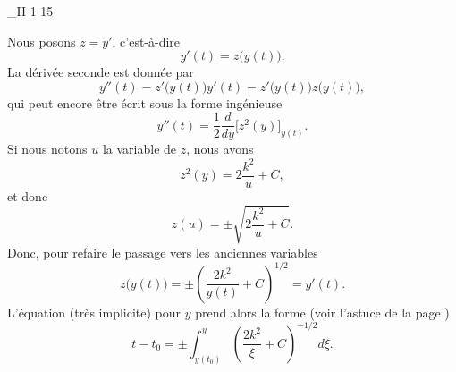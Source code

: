 

\begin{corrige}{_II-1-15}


Nous posons $z=y'$, c'est-à-dire
\begin{equation}
	y'(t)=z\big( y(t) \big).
\end{equation}
La dérivée seconde est donnée par
\begin{equation}
	y''(t)=z'\big( y(t) \big)y'(t)=z'\big( y(t) \big)z\big( y(t) \big),
\end{equation}
qui peut encore être écrit sous la forme ingénieuse
\begin{equation}
	y''(t)=\frac{ 1 }{2}\frac{ d }{ dy }\Big[ z^2(y) \Big]_{y(t)}.
\end{equation}
Si nous notons $u$ la variable de $z$, nous avons
\begin{equation}
	z^2(y)=2\frac{ k^2 }{ u }+C,
\end{equation}
et donc
\begin{equation}
	z(u)=\pm\sqrt{ 2\frac{ k^2 }{ u }+C }.
\end{equation}
Donc, pour refaire le passage vers les anciennes variables
\begin{equation}		\label{EqEqPourPrimeII115}
	z\big( y(t) \big)=\pm\left( \frac{ 2k^2 }{ y(t) }+C \right)^{1/2}=y'(t).
\end{equation}
L'équation (très implicite) pour $y$ prend alors la forme (voir l'astuce de la page \pageref{SecFairedzdt})
\begin{equation}		\label{EqGeneII115IntCsol}
	t-t_0=\pm\int_{y(t_0)}^y\left( \frac{ 2k^2 }{ \xi }+C \right)^{-1/2}d\xi.
\end{equation}



\end{corrige}
